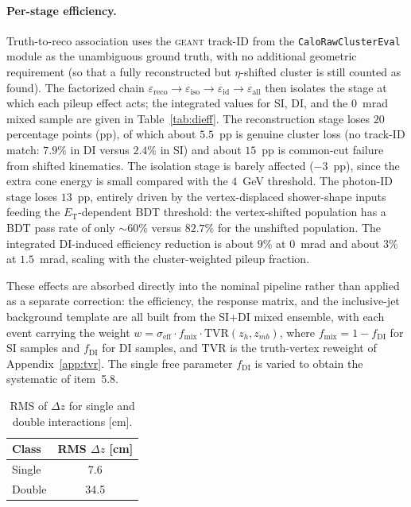 \documentclass[11pt]{article}
\newcommand{\ET}{E_{\mathrm{T}}}
\begin{document}
\paragraph{Per-stage efficiency.} Truth-to-reco association uses the
\textsc{geant} track-ID from the \texttt{CaloRawClusterEval} module as the
unambiguous ground truth, with no additional geometric requirement (so that a
fully reconstructed but $\eta$-shifted cluster is still counted as found). The
factorized chain
$\varepsilon_{\mathrm{reco}}\to\varepsilon_{\mathrm{iso}}\to\varepsilon_{\mathrm{id}}\to\varepsilon_{\mathrm{all}}$
then isolates the stage at which each pileup effect acts; the integrated values
for SI, DI, and the $0$~mrad mixed sample are given in Table~\ref{tab:dieff}.
The reconstruction stage loses $20$ percentage points (pp), of which about
$5.5$~pp is genuine cluster loss (no track-ID match: $7.9\%$ in DI versus $2.4\%$
in SI) and about $15$~pp is common-cut failure from shifted kinematics. The
isolation stage is barely affected ($-3$~pp), since the extra cone energy is small
compared with the $4$~GeV threshold. The photon-ID stage loses $13$~pp, entirely
driven by the vertex-displaced shower-shape inputs feeding the $\ET$-dependent BDT
threshold: the vertex-shifted population has a BDT pass rate of only $\sim60\%$
versus $82.7\%$ for the unshifted population. The integrated DI-induced efficiency
reduction is about $9\%$ at $0$~mrad and about $3\%$ at $1.5$~mrad, scaling with
the cluster-weighted pileup fraction.

These effects are absorbed directly into the nominal pipeline rather than applied
as a separate correction: the efficiency, the response matrix, and the
inclusive-jet background template are all built from the SI$+$DI mixed ensemble,
with each event carrying the weight
$w = \sigma_{\mathrm{eff}}\cdot f_{\mathrm{mix}}\cdot\mathrm{TVR}(z_h,z_{mb})$,
where $f_{\mathrm{mix}}=1-f_{\mathrm{DI}}$ for SI samples and $f_{\mathrm{DI}}$ for
DI samples, and $\mathrm{TVR}$ is the truth-vertex reweight of
Appendix~\ref{app:tvr}. The single free parameter $f_{\mathrm{DI}}$ is varied to
obtain the systematic of item~5.8.

\begin{table}[h]
\centering
\caption{RMS of $\Delta z$ for single and double interactions [cm].}
\label{tab:dz}
\begin{tabular}{lc}
\toprule
Class & RMS $\Delta z$ [cm] \\
\midrule
Single & 7.6 \\
Double & 34.5 \\
\bottomrule
\end{tabular}
\end{table}
\end{document}
